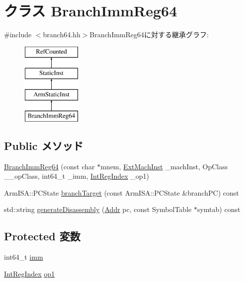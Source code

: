 \hypertarget{classArmISA_1_1BranchImmReg64}{
\section{クラス BranchImmReg64}
\label{classArmISA_1_1BranchImmReg64}
}


{\ttfamily \#include $<$branch64.hh$>$}BranchImmReg64に対する継承グラフ:\begin{figure}[H]
\begin{center}
\leavevmode
\includegraphics[height=4cm]{classArmISA_1_1BranchImmReg64}
\end{center}
\end{figure}
\subsection*{Public メソッド}
\begin{DoxyCompactItemize}
\item 
\hyperlink{classArmISA_1_1BranchImmReg64_ae8be9e127f0ed118d74a515f5d04d475}{BranchImmReg64} (const char $\ast$mnem, \hyperlink{classStaticInst_a5605d4fc727eae9e595325c90c0ec108}{ExtMachInst} \_\-machInst, OpClass \_\-\_\-opClass, int64\_\-t \_\-imm, \hyperlink{namespaceArmISA_ae64680ba9fb526106829d6bf92fc791b}{IntRegIndex} \_\-op1)
\item 
ArmISA::PCState \hyperlink{classArmISA_1_1BranchImmReg64_aef1dd7539a8d8c49730120f2c0b8088e}{branchTarget} (const ArmISA::PCState \&branchPC) const 
\item 
std::string \hyperlink{classArmISA_1_1BranchImmReg64_a95d323a22a5f07e14d6b4c9385a91896}{generateDisassembly} (\hyperlink{classm5_1_1params_1_1Addr}{Addr} pc, const SymbolTable $\ast$symtab) const 
\end{DoxyCompactItemize}
\subsection*{Protected 変数}
\begin{DoxyCompactItemize}
\item 
int64\_\-t \hyperlink{classArmISA_1_1BranchImmReg64_a11b34c3ceec32cc1f14d0ca9c099c470}{imm}
\item 
\hyperlink{namespaceArmISA_ae64680ba9fb526106829d6bf92fc791b}{IntRegIndex} \hyperlink{classArmISA_1_1BranchImmReg64_a4c465c43ad568f8bcf8ae71480e9cfea}{op1}
\end{DoxyCompactItemize}


